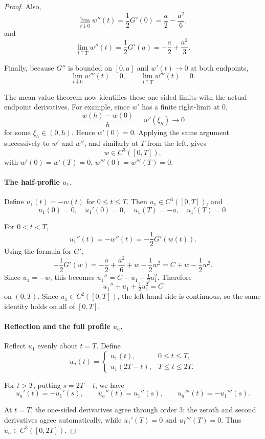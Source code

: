 \begin{proof}
Also,
\[
\lim_{t \downarrow 0} w''(t) = \frac{1}{2}G'(0) = \frac{a}{2} - \frac{a^2}{6},
\]
and
\[
\lim_{t \uparrow T} w''(t) = \frac{1}{2}G'(a) = -\frac{a}{2} + \frac{a^2}{3}.
\]

Finally, because $G''$ is bounded on $[0,a]$ and $w'(t) \to 0$ at both endpoints,
\[
\lim_{t \downarrow 0} w'''(t) = 0, \qquad \lim_{t \uparrow T} w'''(t) = 0.
\]

The mean value theorem now identifies these one-sided limits with the actual endpoint derivatives. For example, since $w'$ has a finite right-limit at $0$,
\[
\frac{w(h) - w(0)}{h} = w'(\xi_h) \to 0
\]
for some $\xi_h \in (0,h)$. Hence $w'(0) = 0$. Applying the same argument successively to $w'$ and $w''$, and similarly at $T$ from the left, gives
\[
w \in C^3([0,T]),
\]
with $w'(0) = w'(T) = 0$, $w'''(0) = w'''(T) = 0$.

\paragraph{The half-profile $u_1$.}
Define $u_1(t) = -w(t)$ for $0 \le t \le T$. Then $u_1 \in C^3([0,T])$, and
\[
u_1(0) = 0, \quad u_1'(0) = 0, \quad u_1(T) = -a, \quad u_1'(T) = 0.
\]

For $0 < t < T$,
\[
u_1''(t) = -w''(t) = -\frac{1}{2}G'(w(t)).
\]
Using the formula for $G'$,
\[
-\frac{1}{2}G'(w) = -\frac{a}{2} + \frac{a^2}{6} + w - \frac{1}{2}w^2 = C + w - \frac{1}{2}w^2.
\]
Since $u_1 = -w$, this becomes $u_1'' = C - u_1 - \frac{1}{2}u_1^2$. Therefore
\[
u_1'' + u_1 + \tfrac{1}{2}u_1^2 = C
\]
on $(0,T)$. Since $u_1 \in C^2([0,T])$, the left-hand side is continuous, so the same identity holds on all of $[0,T]$.

\paragraph{Reflection and the full profile $u_a$.}
Reflect $u_1$ evenly about $t = T$. Define
\[
u_a(t) = \begin{cases} u_1(t), & 0 \le t \le T, \\ u_1(2T - t), & T \le t \le 2T. \end{cases}
\]

For $t > T$, putting $s = 2T - t$, we have
\[
u_a'(t) = -u_1'(s), \qquad u_a''(t) = u_1''(s), \qquad u_a'''(t) = -u_1'''(s).
\]

At $t = T$, the one-sided derivatives agree through order 3: the zeroth and second derivatives agree automatically, while $u_1'(T) = 0$ and $u_1'''(T) = 0$. Thus $u_a \in C^3([0,2T])$.


\end{proof}

